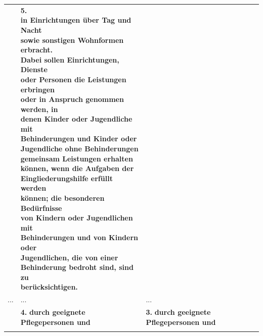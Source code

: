 \documentclass[10pt,a4paper,landscape]{article}
\begin{document}
\begin{longtable}{|L{8.2cm}|L{8.2cm}|L{8.2cm}|}
 & \textbf{\textcolor{diffred}{5.   \newline in Einrichtungen über Tag und Nacht  \newline sowie sonstigen Wohnformen erbracht.  \newline Dabei sollen Einrichtungen, Dienste  \newline oder Personen die Leistungen erbringen  \newline oder in Anspruch genommen werden, in  \newline denen Kinder oder Jugendliche mit  \newline Behinderungen und Kinder oder  \newline Jugendliche ohne Behinderungen  \newline gemeinsam Leistungen erhalten  \newline können, wenn die Aufgaben der  \newline Eingliederungshilfe erfüllt werden  \newline können; die besonderen Bedürfnisse  \newline von Kindern oder Jugendlichen mit  \newline Behinderungen und von Kindern oder  \newline Jugendlichen, die von einer  \newline Behinderung bedroht sind, sind zu  \newline berücksichtigen. }} &  \\
\hhline{|---|}
... & ... & ... \\
\hhline{|---|}
 & \textbf{\textcolor{diffred}{4.}}\textbf{ durch geeignete Pflegepersonen und } & \textbf{\textcolor{diffgreen}{3.}}\textbf{ durch geeignete Pflegepersonen und } \\
\hhline{|---|}

\end{longtable}
\end{document}
